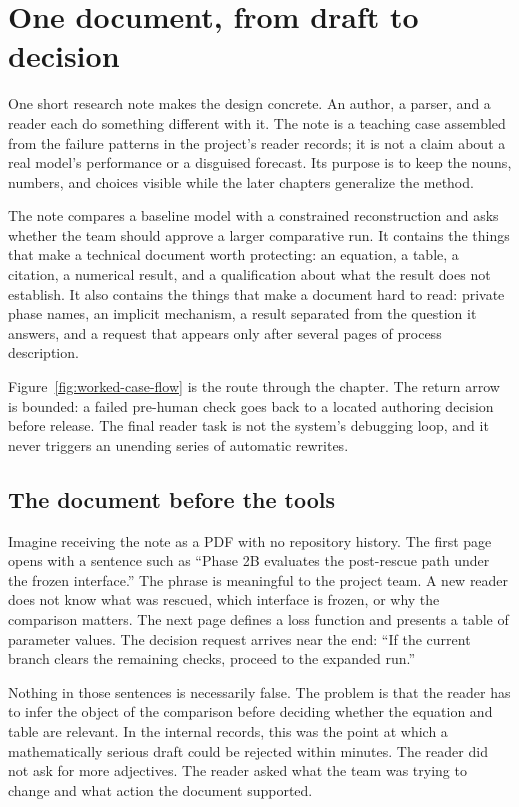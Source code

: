 \chapter{One document, from draft to decision}
\label{ch:worked-case}

One short research note makes the design concrete. An author, a parser, and a
reader each do something different with it. The note is a teaching case
assembled from the failure patterns in the
project's reader records; it is not a claim about a real model's performance or
a disguised forecast. Its purpose is to keep the nouns, numbers, and choices
visible while the later chapters generalize the method.

The note compares a baseline model with a constrained reconstruction and asks
whether the team should approve a larger comparative run. It contains the
things that make a technical document worth protecting: an equation, a table,
a citation, a numerical result, and a qualification about what the result does
not establish. It also contains the things that make a document hard to read:
private phase names, an implicit mechanism, a result separated from the
question it answers, and a request that appears only after several pages of
process description.

Figure~\ref{fig:worked-case-flow} is the route through the chapter. The return
arrow is bounded: a failed pre-human check goes back to a located authoring
decision before release. The final reader task is not the system's debugging
loop, and it never triggers an unending series of automatic rewrites.

\hvFigureWorkedCase

\section{The document before the tools}
\label{sec:case-before}

Imagine receiving the note as a PDF with no repository history. The first page
opens with a sentence such as ``Phase 2B evaluates the post-rescue path under
the frozen interface.'' The phrase is meaningful to the project team. A new
reader does not know what was rescued, which interface is frozen, or why the
comparison matters. The next page defines a loss function and presents a table
of parameter values. The decision request arrives near the end: ``If the
current branch clears the remaining checks, proceed to the expanded run.''

Nothing in those sentences is necessarily false. The problem is that the
reader has to infer the object of the comparison before deciding whether the
equation and table are relevant. In the internal records, this was the point
at which a mathematically serious draft could be rejected within minutes. The
reader did not ask for more adjectives. The reader asked what the team was
trying to change and what action the document supported.

